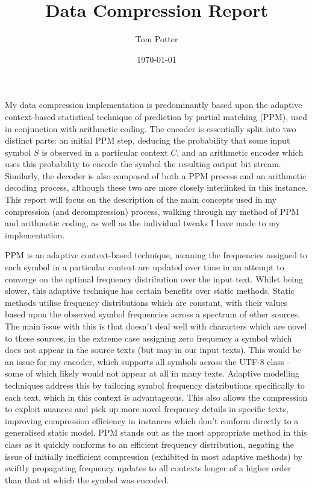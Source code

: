 \documentclass[a4paper, 11pt]{article}
\title{Data Compression Report}
\author{Tom Potter}
\date{\today}
\begin{document}
\maketitle

My data compression implementation is predominantly based upon the adaptive context-based statistical technique of prediction by partial matching (PPM), used in conjunction with arithmetic coding. The encoder is essentially split into two distinct parts: an initial PPM step, deducing the probability that some input symbol $S$ is observed in a particular context $C$, and an arithmetic encoder which uses this probability to encode the symbol the resulting output bit stream. Similarly, the decoder is also composed of both a PPM process and an arithmetic decoding process, although these two are more closely interlinked in this instance. This report will focus on the description of the main concepts used in my compression (and decompression) process, walking through my method of PPM and arithmetic coding, as well as the individual tweaks I have made to my implementation.

PPM is an adaptive context-based technique, meaning the frequencies assigned to each symbol in a particular context are updated over time in an attempt to converge on the optimal frequency distribution over the input text. Whilst being slower, this adaptive technique has certain benefits over static methods. Static methods utilise frequency distributions which are constant, with their values based upon the observed symbol frequencies across a spectrum of other sources. The main issue with this is that doesn't deal well with characters which are novel to these sources, in the extreme case assigning zero frequency a symbol which does not appear in the source texts (but may in our input texts). This would be an issue for my encoder, which supports all symbols across the UTF-8 class - some of which likely would not appear at all in many texts. Adaptive modelling techniques address this by tailoring  symbol frequency distributions specifically to each text, which in this context is advantageous. This also allows the compression to exploit nuances and pick up more novel frequency details in specific texts, improving  compression efficiency in instances which don't conform directly to a generalised static model. PPM stands out as the most appropriate method in this class as it quickly conforms to an efficient frequency distribution, negating the issue of initially inefficient compression (exhibited in most adaptive methods) by swiftly propagating frequency updates to all contexts longer of a higher order than that at which the symbol was encoded.
\end{document}
